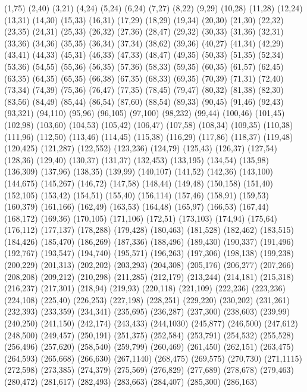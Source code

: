 (1,75)
(2,40)
(3,21)
(4,24)
(5,24)
(6,24)
(7,27)
(8,22)
(9,29)
(10,28)
(11,28)
(12,24)
(13,31)
(14,30)
(15,33)
(16,31)
(17,29)
(18,29)
(19,34)
(20,30)
(21,30)
(22,32)
(23,35)
(24,31)
(25,33)
(26,32)
(27,36)
(28,47)
(29,32)
(30,33)
(31,36)
(32,31)
(33,36)
(34,36)
(35,35)
(36,34)
(37,34)
(38,62)
(39,36)
(40,27)
(41,34)
(42,29)
(43,41)
(44,33)
(45,31)
(46,33)
(47,33)
(48,47)
(49,35)
(50,33)
(51,35)
(52,34)
(53,36)
(54,55)
(55,36)
(56,35)
(57,36)
(58,33)
(59,35)
(60,35)
(61,57)
(62,45)
(63,35)
(64,35)
(65,35)
(66,38)
(67,35)
(68,33)
(69,35)
(70,39)
(71,31)
(72,40)
(73,34)
(74,39)
(75,36)
(76,47)
(77,35)
(78,45)
(79,47)
(80,32)
(81,38)
(82,30)
(83,56)
(84,49)
(85,44)
(86,54)
(87,60)
(88,54)
(89,33)
(90,45)
(91,46)
(92,43)
(93,321)
(94,110)
(95,96)
(96,105)
(97,100)
(98,232)
(99,44)
(100,46)
(101,45)
(102,98)
(103,60)
(104,53)
(105,42)
(106,47)
(107,58)
(108,34)
(109,35)
(110,38)
(111,96)
(112,50)
(113,46)
(114,45)
(115,38)
(116,29)
(117,86)
(118,37)
(119,48)
(120,425)
(121,287)
(122,552)
(123,236)
(124,79)
(125,43)
(126,37)
(127,54)
(128,36)
(129,40)
(130,37)
(131,37)
(132,453)
(133,195)
(134,54)
(135,98)
(136,309)
(137,96)
(138,35)
(139,99)
(140,107)
(141,52)
(142,36)
(143,100)
(144,675)
(145,267)
(146,72)
(147,58)
(148,44)
(149,48)
(150,158)
(151,40)
(152,105)
(153,42)
(154,51)
(155,40)
(156,114)
(157,46)
(158,91)
(159,53)
(160,379)
(161,166)
(162,49)
(163,53)
(164,48)
(165,97)
(166,53)
(167,44)
(168,172)
(169,36)
(170,105)
(171,106)
(172,51)
(173,103)
(174,94)
(175,64)
(176,112)
(177,137)
(178,288)
(179,428)
(180,463)
(181,528)
(182,462)
(183,515)
(184,426)
(185,470)
(186,269)
(187,336)
(188,496)
(189,430)
(190,337)
(191,496)
(192,767)
(193,547)
(194,740)
(195,571)
(196,263)
(197,306)
(198,138)
(199,238)
(200,229)
(201,313)
(202,202)
(203,293)
(204,308)
(205,176)
(206,277)
(207,266)
(208,208)
(209,212)
(210,298)
(211,285)
(212,179)
(213,244)
(214,181)
(215,318)
(216,237)
(217,301)
(218,94)
(219,93)
(220,118)
(221,109)
(222,236)
(223,236)
(224,108)
(225,40)
(226,253)
(227,198)
(228,251)
(229,220)
(230,202)
(231,261)
(232,393)
(233,359)
(234,341)
(235,695)
(236,287)
(237,300)
(238,603)
(239,99)
(240,250)
(241,150)
(242,174)
(243,433)
(244,1030)
(245,877)
(246,500)
(247,612)
(248,500)
(249,457)
(250,191)
(251,375)
(252,584)
(253,791)
(254,532)
(255,528)
(256,496)
(257,620)
(258,540)
(259,799)
(260,469)
(261,450)
(262,151)
(263,475)
(264,593)
(265,668)
(266,630)
(267,1140)
(268,475)
(269,575)
(270,730)
(271,1115)
(272,598)
(273,385)
(274,379)
(275,569)
(276,829)
(277,689)
(278,678)
(279,463)
(280,472)
(281,617)
(282,493)
(283,663)
(284,407)
(285,300)
(286,163)
